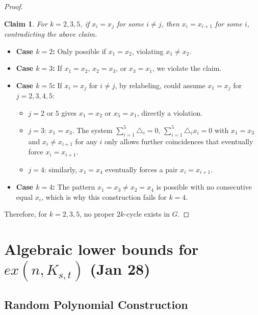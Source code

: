 \documentclass[a4paper]{article}
\newtheorem{claim}[thm]{Claim}
\begin{document}
\begin{proof}
        \begin{claim}
            For $k=2,3,5$, if $x_i=x_j$ for some $i\neq j$, then $x_i=x_{i+1}$ for some $i$, contradicting the above claim.
        \end{claim}
        \begin{itemize}
            \item \textbf{Case $k=2$:} Only possible if $x_1 = x_2$, violating $x_1\neq x_2$.
            \item \textbf{Case $k=3$:} If $x_1 = x_2$, $x_2 = x_3$, or $x_3=x_1$, we violate the claim.
            \item \textbf{Case $k=5$:} If $x_i = x_j$ for $i\neq j$, by relabeling, could assume $x_1 = x_j$ for $j=2,3,4,5$:
                \begin{itemize}
                    \item $j=2$ or $5$ gives $x_1 = x_2$ or $x_5 = x_1$, directly a violation.
                    \item $j=3$: $x_1 = x_3$. The system $\sum_{i=1}^5 \triangle_i = 0$, $\sum_{i=1}^5 \triangle_i x_i = 0$ with $x_1 = x_3$ and $x_i \neq x_{i+1}$ for any $i$ only allows further coincidences that eventually force $x_i = x_{i+1}$.
                    \item $j=4$: similarly, $x_1 = x_4$ eventually forces a pair $x_i = x_{i+1}$.
                \end{itemize}
            \item \textbf{Case $k=4$:} The pattern $x_1 = x_3 \neq x_2 = x_4$ is possible with no consecutive equal $x_i$, which is why this construction fails for $k=4$.
        \end{itemize}

        Therefore, for $k=2,3,5$, no proper $2k$-cycle exists in $G$.
\end{proof}
\newpage
\section{Algebraic lower bounds for $ex(n,K_{s,t})$ (Jan 28)}

\subsection{Random Polynomial Construction}
\end{document}
